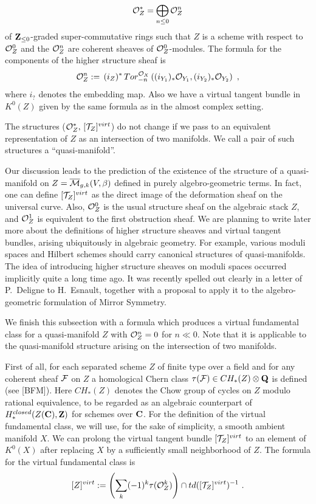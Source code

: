 \documentclass{amsart}
\begin{document}
 $$\mathcal O_Z^*=\bigoplus_{n\le 0} \mathcal O^n_Z$$
of $\mathbf Z_{\le 0}$-graded super-commutative rings such that $Z$ is a scheme with
respect to $\mathcal O^0_Z$ and the $\mathcal O^n_Z$ are coherent sheaves of $\mathcal
O^0_Z$-modules.  The formula for the components of the higher structure sheaf
is
$$\mathcal O^n_Z:=\, (i_Z)^* \,Tor_{-n}^{\mathcal O_X}\left( (i_{Y_1})_*\mathcal
O_{Y_1},(i_{Y_2})_*\mathcal O_{Y_2}\right)\,\,,$$
where $i_?$ denotes the embedding map.
  Also we have a virtual tangent bundle in $K^0(Z)$ given by the same formula
as in the almost complex setting.

The structures ($\mathcal O_Z^*,\,[\mathcal T_Z]^{virt}$) do not change if we pass to
an equivalent representation of $Z$ as an intersection of two manifolds. We
call a pair of such structures a ``quasi-manifold''.

Our discussion leads to the prediction of the existence of the structure of a
quasi-manifold on $Z=\overline{\mathcal{M}}_{g,k}(V,\beta)$
  defined in purely algebro-geometric terms.
  In fact, one can define $[\mathcal T_Z]^{virt}$ as the direct image of the
deformation sheaf on the universal curve. Also, $\mathcal O^0_Z$
 is the usual structure sheaf on the algebraic stack $Z$, and $\mathcal O^1_Z$ is
equivalent  to the first obstruction sheaf. We are planning to write later more
about the definitions of higher structure sheaves and virtual tangent bundles,
arising ubiquitously in algebraic geometry. For example, various moduli spaces
and Hilbert schemes should carry canonical structures of quasi-manifolds.
  The idea of introducing higher structure sheaves on moduli spaces occurred
implicitly quite a long time ago. It was recently spelled  out clearly in a
letter of P.~Deligne to H.~Esnault, together with a proposal to apply it  to
the algebro-geometric formulation of Mirror Symmetry.

We finish this subsection with a formula which produces a  virtual fundamental
class for a quasi-manifold $Z$ with $\mathcal O^n_Z=0$
 for $n\ll 0$. Note that it is applicable to the quasi-manifold structure
arising on the intersection of two manifolds.

First of all, for each separated scheme $Z$ of finite type over a field
 and for any coherent sheaf $\mathcal F$ on $Z$ a homological Chern class
$\tau(\mathcal F)\in CH_*(Z)\otimes \mathbf Q$ is defined (see [BFM]).  Here $CH_*(Z)$
denotes the Chow group of cycles on $Z$ modulo rational equivalence, to be
regarded as an algebraic counterpart of $H_*^{closed}(Z(\mathbf C),\mathbf Z)$ for schemes
over $\mathbf C$.
For the definition of the virtual fundamental class, we will use, for the sake
of simplicity, a smooth ambient manifold $X$.
 We can prolong the virtual tangent bundle $[\mathcal T_Z]^{virt}$
 to an element of $K^0(X)$ after replacing $X$ by a sufficiently small
neighborhood of $Z$. The formula for the virtual fundamental class is
$$[Z]^{virt}:=\left(\sum_k (-1)^k \tau(\mathcal O^k_Z)\right)\cap td([\mathcal
T_Z]^{virt})^{-1}\,\,.$$
\end{document}
